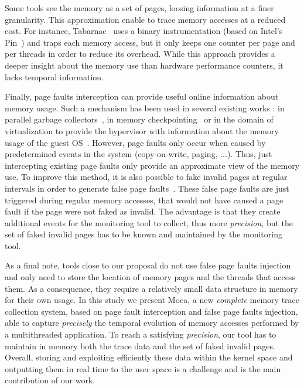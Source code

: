 Some tools see the memory as a set of pages, loosing information at a finer
granularity. This approximation enable to trace memory accesses at a reduced
cost. For instance, \gls{Tabarnac}~\cite{Beniamine15TABARNAC} uses a binary
instrumentation (based on Intel's Pin~\cite{Luk05Pin}) and traps each
memory access, but it only keeps one counter per page and per threads in order to
reduce its overhead. While this approach provides a deeper insight about the
memory use than hardware performance counters, it lacks temporal information.





Finally, page faults interception can provide useful online information about memory usage.
Such a mechanism has been used in several existing works : in parallel garbage collectors~\cite{Boehm91Mostly}, in memory checkpointing~\cite{Heo05Spaceefficient} or in the domain of virtualization to provide the hypervisor with information about the memory usage of the guest \gls{OS}~\cite{Jones06Geiger}.
However, page faults only occur when caused by predetermined events in the system (copy-on-write, paging, ...).
Thus, just intercepting existing page faults only provide an approximate view of the memory use.
To improve this method, it is also possible to fake invalid pages at regular intervals in order to generate false page faults~\cite{Bae12Dynamic,Diener13CommunicationBased}.
 These false page faults are just triggered during regular memory accesses, that would not have caused a page fault if the page were not faked as invalid.
The advantage is that they create additional events for the monitoring tool to collect, thus more \emph{precision}, but the set of faked invalid pages has to be known and maintained by the monitoring tool.

As a final note, tools close to our proposal do not use false page faults injection and only need to store the location of memory pages and the threads that access them.
As a consequence, they require a relatively small data structure in memory for their own usage.
In this study we present \gls{Moca}, a new \emph{complete} memory trace collection system, based on page fault interception and false page faults injection, able to capture \emph{precisely} the temporal evolution of memory accesses performed by a multithreaded application.
To reach a satisfying \emph{precision}, our tool has to maintain in memory both the trace data and the set of faked invalid pages.
Overall, storing and exploiting efficiently these data within the kernel space and outputting them in real time to the user space is a challenge and is the main contribution of our work.



